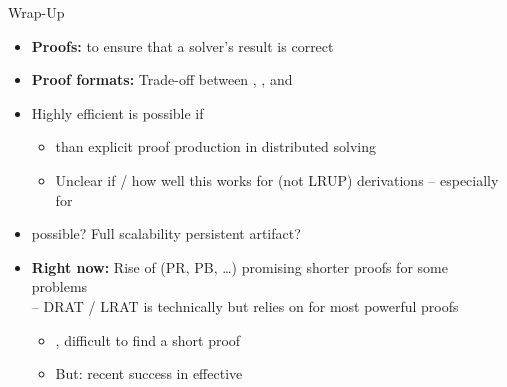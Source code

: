 \documentclass[t,english]{sdqbeamer}
\begin{document}
\begin{frame}{Wrap-Up}
	\begin{itemize}
		\item \textbf{Proofs:}  to ensure that a solver's result is correct
		\item \textbf{Proof formats:} Trade-off between , , and 
		\pause
		\vspace*{2mm}
		\item Highly efficient  is possible if 
		\begin{itemize}
			\item {} than explicit proof production in distributed solving
			\item Unclear if / how well this works for  (not LRUP) derivations -- especially for 
		\end{itemize}
		\item {} possible? Full scalability  persistent artifact?
		\pause
		\item \textbf{Right now:} Rise of  (PR, PB, \ldots) promising shorter proofs for some problems~\cite{balyo2023proceedings}
		\\[1mm]-- DRAT / LRAT is technically  but relies on  for most powerful proofs
		\begin{itemize}
			\item {}, difficult to find a short proof
			\item But: recent success in effective ~\cite{haberlandt2023effective}
		\end{itemize}
	\end{itemize}
\end{frame}
\fi
\end{document}
